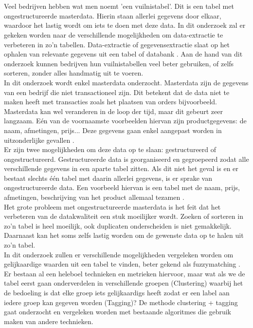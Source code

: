 
\chapter{}%
\label{ch:inleiding}

Veel bedrijven hebben wat men noemt 'een vuilnistabel'. Dit is een tabel met ongestructureerde masterdata. Hierin staan allerlei gegevens door elkaar, waardoor het lastig wordt om iets te doen met deze data. In dit onderzoek zal er gekeken worden naar de verschillende mogelijkheden om data-extractie te verbeteren in zo'n tabellen. Data-extractie of gegevensextractie slaat op het ophalen van relevante gegevens uit een tabel of databank \autocite{Encyclo.nl}. Aan de hand van dit onderzoek kunnen bedrijven hun vuilnistabellen veel beter gebruiken, of zelfs sorteren, zonder alles handmatig uit te voeren.
\\\indent
In dit onderzoek wordt enkel masterdata onderzocht. Masterdata zijn de gegevens van een bedrijf die niet transactioneel zijn. Dit betekent dat de data niet te maken heeft met transacties zoals het plaatsen van orders bijvoorbeeld. Masterdata kan wel veranderen in de loop der tijd, maar dit gebeurt zeer langzaam. Eén van de voornaamste voorbeelden hiervan zijn productgegevens: de naam, afmetingen, prijs... Deze gegevens gaan enkel aangepast worden in uitzonderlijke gevallen \autocite{Yellowground}.
\\\indent
Er zijn twee mogelijkheden om deze data op te slaan: gestructureerd of ongestructureerd. Gestructureerde data is georganiseerd en gegroepeerd zodat alle verschillende gegevens in een aparte tabel zitten. Als dit niet het geval is en er bestaat slechts één tabel met daarin allerlei gegevens, is er sprake van ongestructureerde data. Een voorbeeld hiervan is een tabel met de naam, prijs, afmetingen, beschrijving van het product allemaal tezamen \autocite{Seagate}.
\\\indent
Het grote probleem met ongestructureerde masterdata is het feit dat het verbeteren van de datakwaliteit een stuk moeilijker wordt. Zoeken of sorteren in zo'n tabel is heel moeilijk, ook duplicaten onderscheiden is niet gemakkelijk. Daarnaast kan het soms zelfs lastig worden om de gewenste data op te halen uit zo'n tabel.
\\\indent
In dit onderzoek zullen er verschillende mogelijkheden vergeleken worden om gelijkaardige waarden uit een tabel te vinden, beter gekend als fuzzymatching \autocite{Silva2022}. Er bestaan al een heleboel technieken en metrieken hiervoor, maar wat als we de tabel eerst gaan onderverdelen in verschillende groepen (Clustering) waarbij het de bedoeling is dat elke groep iets gelijkaardigs heeft zodat er een label aan iedere groep kan gegeven worden (Tagging)? De methode clustering + tagging gaat onderzocht en vergeleken worden met bestaande algoritmes die gebruik maken van andere technieken.
